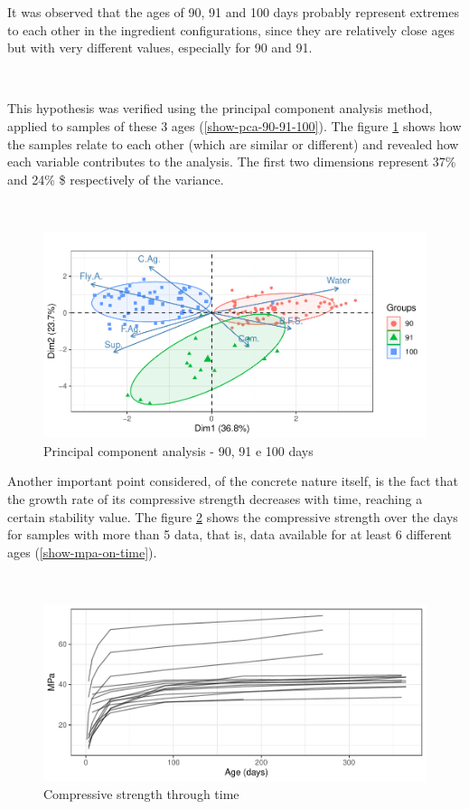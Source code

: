 \documentclass[
]{article}
\begin{document}
It was observed that the ages of 90, 91 and 100 days probably represent
extremes to each other in the ingredient configurations, since they are
relatively close ages but with very different values, especially for 90
and 91.

~

This hypothesis was verified using the principal component analysis
method, applied to samples of these 3 ages (\ref{show-pca-90-91-100}).
The figure \ref{fig:pca-90-91-100} shows how the samples relate to each
other (which are similar or different) and revealed how each variable
contributes to the analysis. The first two dimensions represent 37\% and
24\% \$ respectively of the variance.

~

\begin{figure}

{\centering \includegraphics{paper_EN_files/figure-latex/pca-90-91-100-1} 

}

\caption{Principal component analysis - 90, 91 e 100 days}\label{fig:pca-90-91-100}
\end{figure}

Another important point considered, of the concrete nature itself, is
the fact that the growth rate of its compressive strength decreases with
time, reaching a certain stability value. The figure
\ref{fig:mpa-on-time} shows the compressive strength over the days for
samples with more than 5 data, that is, data available for at least 6
different ages (\ref{show-mpa-on-time}).

~

\begin{figure}

{\centering \includegraphics{paper_EN_files/figure-latex/mpa-on-time-1} 

}

\caption{Compressive strength through time}\label{fig:mpa-on-time}
\end{figure}
\end{document}
